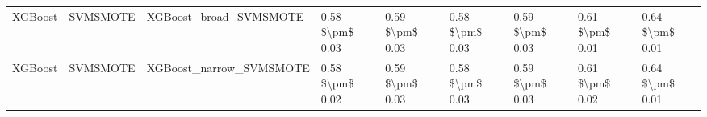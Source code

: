 \begin{tabular}{lllllllll}
                        XGBoost &                      SVMSMOTE &                       XGBoost\_broad\_SVMSMOTE & 0.58 \$\textbackslash pm\$ 0.03 &           0.59 \$\textbackslash pm\$ 0.03 &       0.58 \$\textbackslash pm\$ 0.03 &        0.59 \$\textbackslash pm\$ 0.03 &                         0.61 \$\textbackslash pm\$ 0.01 &     0.64 \$\textbackslash pm\$ 0.01 \\
                        XGBoost &                      SVMSMOTE &                      XGBoost\_narrow\_SVMSMOTE & 0.58 \$\textbackslash pm\$ 0.02 &           0.59 \$\textbackslash pm\$ 0.03 &       0.58 \$\textbackslash pm\$ 0.03 &        0.59 \$\textbackslash pm\$ 0.03 &                         0.61 \$\textbackslash pm\$ 0.02 &     0.64 \$\textbackslash pm\$ 0.01 \\
\bottomrule
\end{tabular}
